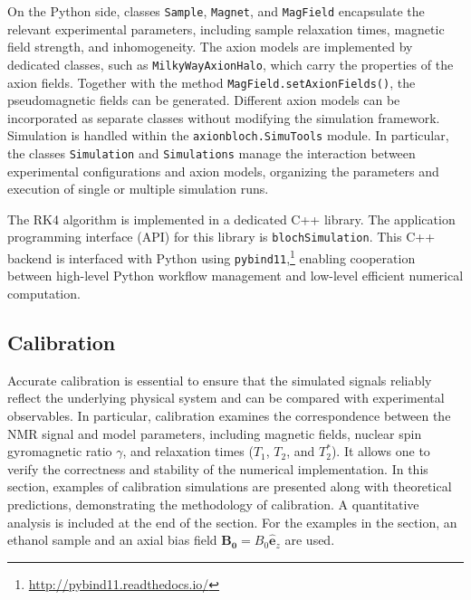 \documentclass[universe,article,submit,oneauthor]{Definitions/mdpi}
\begin{document}
On the Python side, classes \texttt{Sample}, \texttt{Magnet}, and \texttt{MagField} encapsulate the relevant experimental parameters, including sample relaxation times, magnetic field strength, and inhomogeneity. 
The axion models are implemented by dedicated classes, such as \texttt{MilkyWayAxionHalo}, which carry the properties of the axion fields. Together with the method \texttt{MagField.setAxionFields()}, the pseudomagnetic fields can be generated. 
Different axion models can be incorporated as separate classes without modifying the simulation framework. 
Simulation is handled within the \texttt{axionbloch.SimuTools} module. 
In particular, the classes \texttt{Simulation} and \texttt{Simulations} manage the interaction between experimental configurations and axion models, organizing the parameters and execution of single or multiple simulation runs. 

The RK4 algorithm is implemented in a dedicated C++ library. 
The application programming interface (API) for this library is \texttt{blochSimulation}. 
This C++ backend is interfaced with Python using \texttt{pybind11},\footnote{\url{http://pybind11.readthedocs.io/}} enabling cooperation between high-level Python workflow management and low-level efficient numerical computation. 

\subsection{Calibration}
\label{sec:calibration}

Accurate calibration is essential to ensure that the simulated signals reliably reflect the underlying physical system and can be compared with experimental observables. 
In particular, calibration examines the correspondence between the NMR signal and model parameters, including magnetic fields, nuclear spin gyromagnetic ratio $\gamma$, and relaxation times ($T_1$, $T_2$, and $T_2^*$). 
It allows one to verify the correctness and stability of the numerical implementation. 
In this section, examples of calibration simulations are presented along with theoretical predictions, demonstrating the methodology of calibration. 
A quantitative analysis is included at the end of the section. 
For the examples in the section, an ethanol sample and an axial bias field $\mathbf{B_{0}} = B_0 \mathbf{\hat{e}}_z$ are used. 
\end{document}
